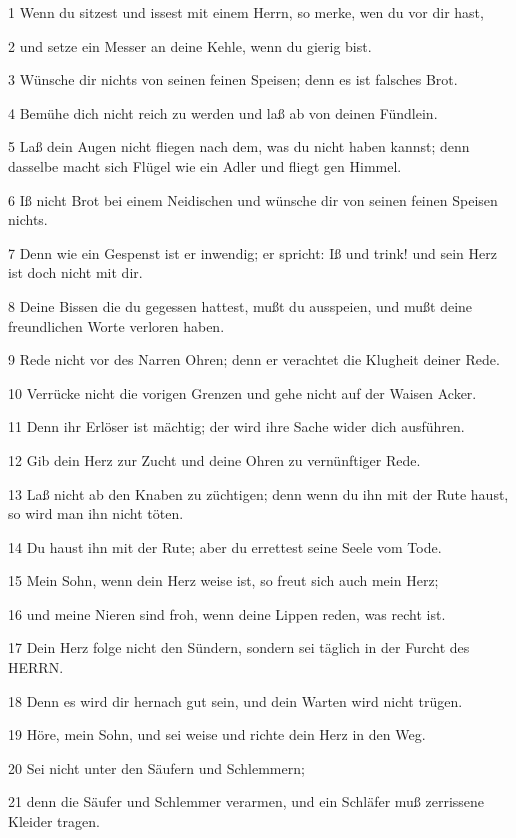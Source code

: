 \par 1 Wenn du sitzest und issest mit einem Herrn, so merke, wen du vor dir hast,
\par 2 und setze ein Messer an deine Kehle, wenn du gierig bist.
\par 3 Wünsche dir nichts von seinen feinen Speisen; denn es ist falsches Brot.
\par 4 Bemühe dich nicht reich zu werden und laß ab von deinen Fündlein.
\par 5 Laß dein Augen nicht fliegen nach dem, was du nicht haben kannst; denn dasselbe macht sich Flügel wie ein Adler und fliegt gen Himmel.
\par 6 Iß nicht Brot bei einem Neidischen und wünsche dir von seinen feinen Speisen nichts.
\par 7 Denn wie ein Gespenst ist er inwendig; er spricht: Iß und trink! und sein Herz ist doch nicht mit dir.
\par 8 Deine Bissen die du gegessen hattest, mußt du ausspeien, und mußt deine freundlichen Worte verloren haben.
\par 9 Rede nicht vor des Narren Ohren; denn er verachtet die Klugheit deiner Rede.
\par 10 Verrücke nicht die vorigen Grenzen und gehe nicht auf der Waisen Acker.
\par 11 Denn ihr Erlöser ist mächtig; der wird ihre Sache wider dich ausführen.
\par 12 Gib dein Herz zur Zucht und deine Ohren zu vernünftiger Rede.
\par 13 Laß nicht ab den Knaben zu züchtigen; denn wenn du ihn mit der Rute haust, so wird man ihn nicht töten.
\par 14 Du haust ihn mit der Rute; aber du errettest seine Seele vom Tode.
\par 15 Mein Sohn, wenn dein Herz weise ist, so freut sich auch mein Herz;
\par 16 und meine Nieren sind froh, wenn deine Lippen reden, was recht ist.
\par 17 Dein Herz folge nicht den Sündern, sondern sei täglich in der Furcht des HERRN.
\par 18 Denn es wird dir hernach gut sein, und dein Warten wird nicht trügen.
\par 19 Höre, mein Sohn, und sei weise und richte dein Herz in den Weg.
\par 20 Sei nicht unter den Säufern und Schlemmern;
\par 21 denn die Säufer und Schlemmer verarmen, und ein Schläfer muß zerrissene Kleider tragen.
